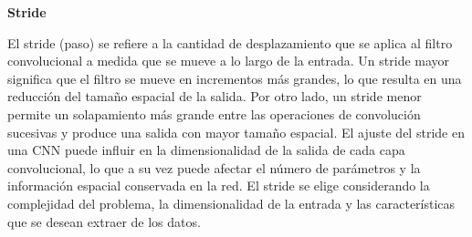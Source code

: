 \textbf{Stride}

El stride (paso) se refiere a la cantidad de desplazamiento que se aplica al filtro convolucional a medida que se mueve a lo largo de la entrada. Un stride mayor significa que el filtro se mueve en incrementos más grandes, lo que resulta en una reducción del tamaño espacial de la salida. Por otro lado, un stride menor permite un solapamiento más grande entre las operaciones de convolución sucesivas y produce una salida con mayor tamaño espacial.
El ajuste del stride en una CNN puede influir en la dimensionalidad de la salida de cada capa convolucional, lo que a su vez puede afectar el número de parámetros y la información espacial conservada en la red. El stride se elige considerando la complejidad del problema, la dimensionalidad de la entrada y las características que se desean extraer de los datos.


	